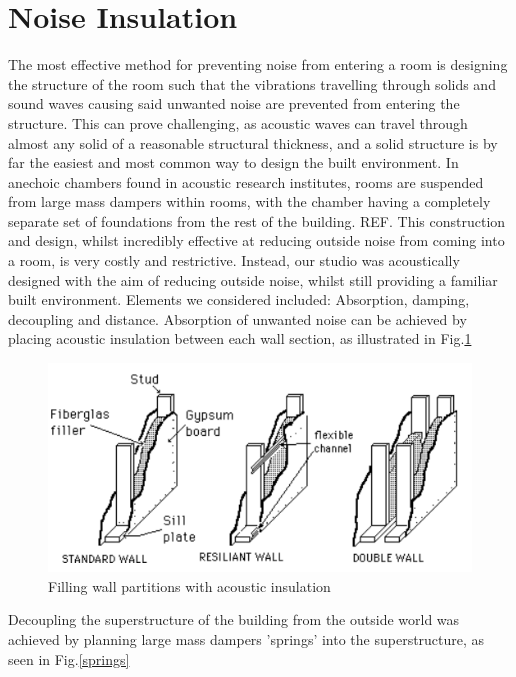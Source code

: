 \documentclass[10pt, twocolumn]{article}
\begin{document}
    \section{Noise Insulation}
        The most effective method for preventing noise from entering a room is designing the structure of the room such that the vibrations travelling through solids and sound waves causing said unwanted noise are prevented from entering the structure.
        This can prove challenging, as acoustic waves can travel through almost any solid of a reasonable structural thickness, and a solid structure is by far the easiest and most common way to design the built environment.
        In anechoic chambers found in acoustic research institutes, rooms are suspended from large mass dampers within rooms, with the chamber having a completely separate set of foundations from the rest of the building. REF.
        This construction and design, whilst incredibly effective at reducing outside noise from coming into a room, is very costly and restrictive.
        Instead, our studio was acoustically designed with the aim of reducing outside noise, whilst still providing a familiar built environment.
        Elements we considered included: Absorption, damping, decoupling and distance.
        Absorption of unwanted noise can be achieved by placing acoustic insulation between each wall section, as illustrated in Fig.\ref{wallFiller}
        \begin{figure}[H]
            \includegraphics[scale = 0.6]{resources/wallFiller.png}
            \caption{Filling wall partitions with acoustic insulation \cite{UCSC}}
            \label{wallFiller}
            \centering
        \end{figure}
        Decoupling the superstructure of the building from the outside world was achieved by planning large mass dampers 'springs' into the superstructure, as seen in Fig.\ref{springs}
\end{document}

